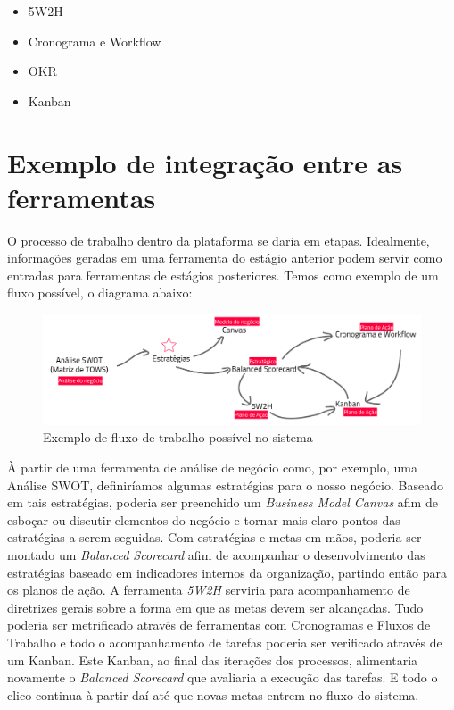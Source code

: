 \documentclass{abnt}
\begin{document}
\begin{itemize}
	\item 5W2H \cite{5W2H}
	\item Cronograma e Workflow \cite{Crono}\cite{WorkFlow}
	\item OKR \cite{OKR}
	\item Kanban \cite{Kanban}
\end{itemize}


\section{Exemplo de integração entre as ferramentas}

O processo de trabalho dentro da plataforma se daria em etapas. Idealmente,
informações geradas em uma ferramenta do estágio anterior podem servir como
entradas para ferramentas de estágios posteriores. Temos como exemplo de um
fluxo possível, o diagrama abaixo:

\begin{figure}[!htb]
	\centering
	\includegraphics[width=\textwidth]{fluxograma_exemplo.pdf}
	\caption{Exemplo de fluxo de trabalho possível no sistema}
	\label{Rotulo}
\end{figure}

À partir de uma ferramenta de análise de negócio como, por exemplo, uma Análise
SWOT, definiríamos algumas estratégias para o nosso negócio. Baseado em tais
estratégias, poderia ser preenchido um \textit{Business Model Canvas} afim de
esboçar ou discutir elementos do negócio e tornar mais claro pontos das
estratégias a serem seguidas. Com estratégias e metas em mãos, poderia ser
montado um \textit{Balanced Scorecard} afim de acompanhar o desenvolvimento das
estratégias baseado em indicadores internos da organização, partindo então para
os planos de ação. A ferramenta \textit{5W2H} serviria para acompanhamento de
diretrizes gerais sobre a forma em que as metas devem ser alcançadas. Tudo
poderia ser metrificado através de ferramentas com Cronogramas e Fluxos de
Trabalho e todo o acompanhamento de tarefas poderia ser verificado através de um
Kanban. Este Kanban, ao final das iterações dos processos, alimentaria novamente
o \textit{Balanced Scorecard} que avaliaria a execução das tarefas. E todo o
clico continua à partir daí até que novas metas entrem no fluxo do sistema.
\end{document}
